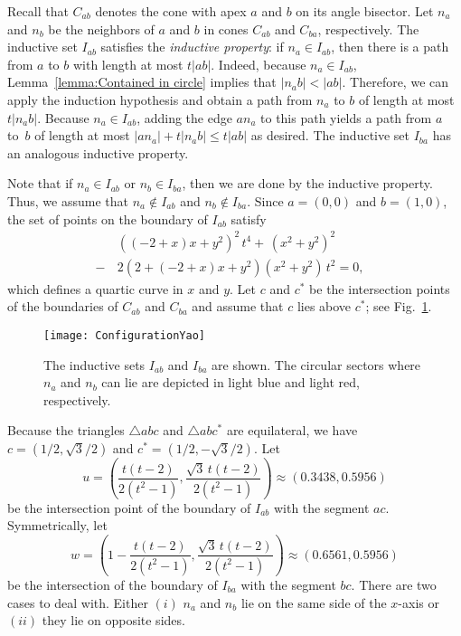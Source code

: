 \documentclass{cccg14}
\begin{document}
\vspace{-0.5em}
Recall that $C_{ab}$ denotes the cone with apex $a$ and $b$ on its angle bisector.
Let $n_a$ and $n_b$ be the neighbors of $a$ and $b$ in cones $C_{ab}$ and $C_{ba}$, respectively.
The inductive set $I_{ab}$ satisfies the \emph{inductive property}:
if $n_a \in I_{ab}$,
then there is a path from $a$ to $b$ with length at most $t|ab|$.
Indeed,
because $n_a \in I_{ab}$, Lemma~\ref{lemma:Contained in circle} implies that $|n_a b| < |ab|$.
Therefore,
we can apply the induction hypothesis and obtain a path from $n_a$ to $b$ of length at most $t|n_a b|$. 
Because $n_a\in I_{ab}$, adding the edge $an_a$ to this path yields a path from $a$ to~$b$ 
of length at most $|an_a| + t|n_a b| \leq t|ab|$ as desired.
The inductive set $I_{ba}$ has an analogous inductive property.

Note that if $n_a \in I_{ab}$
or $n_b \in I_{ba}$,
then we are done by the inductive property.
Thus, we assume that $n_a \not\in I_{ab}$ and $n_b \not\in I_{ba}$.
Since $a = (0,0)$ and $b = (1,0)$,
the set of points on the boundary of $I_{ab}$ satisfy
\begin{align}
\nonumber
 & ((-2 + x) x + y^2)^2 \, t^4+ \,   (x^2 + y^2)^2&\\ 
\label{eq:quartic}
- \, & 2 (2 + (-2 + x) x + y^2) (x^2 + y^2) \, t^2
 = 0,
\end{align}
which defines a quartic curve in $x$ and $y$. 
Let $c$ and $c^*$ be the intersection points of the boundaries of $C_{ab}$ and $C_{ba}$ and assume that $c$ lies above $c^*$;
see Fig.~\ref{fig:Configuration}.
\begin{figure}[t]
\centering
\texttt{[image: ConfigurationYao]}
\caption{\small The inductive sets $I_{ab}$ and $I_{ba}$ are shown. The circular sectors where $n_a$ and $n_b$ can lie are depicted in light blue and light red, respectively.}
\label{fig:Configuration}
\end{figure}
Because the triangles $\triangle abc$ and $\triangle abc^*$ are equilateral,
we have $c = (1/2, \sqrt{3}/2)$ and $c^* = (1/2, -\sqrt{3}/2)$.
Let
\begin{equation}
\label{eq:Coordinates of u}
u = \left ( \frac{t(t-2)}{2(t^2-1)}, \frac{\sqrt{3} \, t(t-2)}{2(t^2-1)}   \right ) \approx (0.3438, 0.5956)
\end{equation}
be the intersection point of the boundary of $I_{ab}$ with the segment $ac$. 
Symmetrically,
let
$$w =\left ( 1-\frac{t(t-2)}{2(t^2-1)}, \frac{\sqrt{3} \, t(t-2)}{2(t^2-1)}   \right ) \approx (0.6561, 0.5956)$$
be the intersection of the boundary of $I_{ba}$ with the segment $bc$.
There are two cases to deal with. Either $(i)$ $n_a$ and $n_b$ lie on the same side of the $x$-axis
or $(ii)$ they lie on opposite sides.
\end{document}
